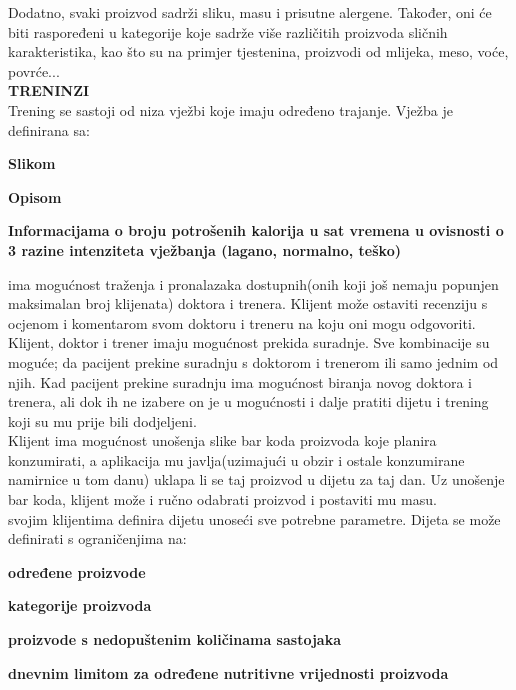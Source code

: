 		Dodatno, svaki proizvod sadrži sliku, masu i prisutne alergene. Također, oni će biti raspoređeni u kategorije koje sadrže više različitih proizvoda sličnih karakteristika, kao što su na primjer tjestenina, proizvodi od mlijeka, meso, voće, povrće...\\
		
		\noindent \textbf{TRENINZI}\\
		Trening se sastoji od niza vježbi koje imaju određeno trajanje. Vježba je definirana sa:
		\begin{packed_item}
		\item \textbf{Slikom}
		\item \textbf{Opisom}
		\item \textbf{Informacijama o broju potrošenih kalorija u sat vremena u ovisnosti o 3 razine intenziteta vježbanja (lagano, normalno, teško)}
		\end{packed_item}
			
		ima mogućnost traženja i pronalazaka dostupnih(onih koji još nemaju popunjen maksimalan broj klijenata) doktora i trenera. Klijent može ostaviti recenziju s ocjenom i komentarom svom doktoru i treneru na koju oni mogu odgovoriti. Klijent, doktor i trener imaju mogućnost prekida suradnje. Sve kombinacije su moguće; da pacijent prekine suradnju s doktorom i trenerom ili samo jednim od njih. Kad pacijent prekine suradnju ima mogućnost biranja novog doktora i trenera, ali dok ih ne izabere on je u mogućnosti i dalje pratiti dijetu i trening koji su mu prije bili dodjeljeni.\\
		Klijent ima mogućnost unošenja slike bar koda proizvoda koje planira konzumirati, a aplikacija mu javlja(uzimajući u obzir i ostale konzumirane namirnice u tom danu) uklapa li se taj proizvod u dijetu za taj dan. Uz unošenje bar koda, klijent može i ručno odabrati proizvod i postaviti mu masu.\\
		
		svojim klijentima definira dijetu unoseći sve potrebne parametre. Dijeta se može definirati s ograničenjima na:\\
		\begin{packed_item}
		\item \textbf{određene proizvode}	
		\item \textbf{kategorije proizvoda}	
		\item \textbf{proizvode s nedopuštenim količinama sastojaka}	
		\item \textbf{dnevnim limitom za određene nutritivne vrijednosti proizvoda}
	\end{packed_item}
		
